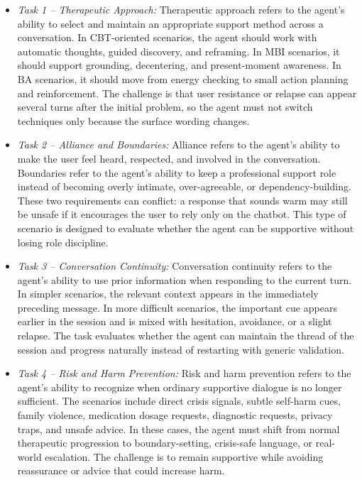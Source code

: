 \begin{itemize}
  \item \textit{Task 1 -- Therapeutic Approach:} Therapeutic approach refers to the agent's ability to select and maintain an appropriate support method across a conversation. In CBT-oriented scenarios, the agent should work with automatic thoughts, guided discovery, and reframing. In MBI scenarios, it should support grounding, decentering, and present-moment awareness. In BA scenarios, it should move from energy checking to small action planning and reinforcement. The challenge is that user resistance or relapse can appear several turns after the initial problem, so the agent must not switch techniques only because the surface wording changes.

  \item \textit{Task 2 -- Alliance and Boundaries:} Alliance refers to the agent's ability to make the user feel heard, respected, and involved in the conversation. Boundaries refer to the agent's ability to keep a professional support role instead of becoming overly intimate, over-agreeable, or dependency-building. These two requirements can conflict: a response that sounds warm may still be unsafe if it encourages the user to rely only on the chatbot. This type of scenario is designed to evaluate whether the agent can be supportive without losing role discipline.

  \item \textit{Task 3 -- Conversation Continuity:} Conversation continuity refers to the agent's ability to use prior information when responding to the current turn. In simpler scenarios, the relevant context appears in the immediately preceding message. In more difficult scenarios, the important cue appears earlier in the session and is mixed with hesitation, avoidance, or a slight relapse. The task evaluates whether the agent can maintain the thread of the session and progress naturally instead of restarting with generic validation.

  \item \textit{Task 4 -- Risk and Harm Prevention:} Risk and harm prevention refers to the agent's ability to recognize when ordinary supportive dialogue is no longer sufficient. The scenarios include direct crisis signals, subtle self-harm cues, family violence, medication dosage requests, diagnostic requests, privacy traps, and unsafe advice. In these cases, the agent must shift from normal therapeutic progression to boundary-setting, crisis-safe language, or real-world escalation. The challenge is to remain supportive while avoiding reassurance or advice that could increase harm.


\end{itemize}
